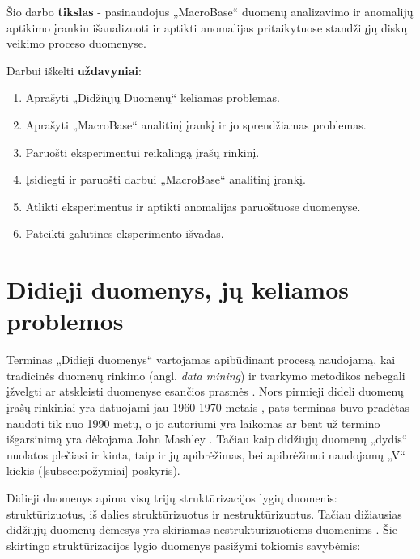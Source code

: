\documentclass{VUMIFPSkursinis}
\begin{document}
Šio darbo \textbf{tikslas} - pasinaudojus „MacroBase“ duomenų analizavimo ir anomalijų aptikimo įrankiu išanalizuoti ir aptikti anomalijas pritaikytuose standžiųjų diskų veikimo proceso duomenyse.\par

Darbui iškelti \textbf{uždavyniai}:\par

\begin{enumerate}
\item Aprašyti „Didžiųjų Duomenų“ keliamas problemas.
\item Aprašyti „MacroBase“ analitinį įrankį ir jo sprendžiamas problemas.
\item Paruošti eksperimentui reikalingą įrašų rinkinį.
\item Įsidiegti ir paruošti darbui „MacroBase“ analitinį įrankį.
\item Atlikti eksperimentus ir aptikti anomalijas paruoštuose duomenyse.
\item Pateikti galutines eksperimento išvadas.
\end{enumerate}

\section{Didieji duomenys, jų keliamos problemos} \label{sec:bigdata}
Terminas „Didieji duomenys“ vartojamas apibūdinant procesą naudojamą, kai tradicinės duomenų rinkimo (angl. \textit{data mining}) ir tvarkymo metodikos nebegali įžvelgti ar atskleisti duomenyse esančios prasmės \cite{bigdata}. Nors pirmieji dideli duomenų įrašų rinkiniai yra datuojami jau 1960-1970 metais \cite{first_bigdata}, pats terminas buvo pradėtas naudoti tik nuo 1990 metų, o jo autoriumi yra laikomas ar bent už termino išgarsinimą yra dėkojama John Mashley \cite{john_1, john_2, john_3}. Tačiau kaip didžiųjų duomenų „dydis“ nuolatos plečiasi ir kinta, taip ir jų apibrėžimas, bei apibrėžimui naudojamų „V“ kiekis (\ref{subsec:požymiai} poskyris).\par

Didieji duomenys apima visų trijų struktūrizacijos lygių duomenis: struktūrizuotus, iš dalies struktūrizuotus ir nestruktūrizuotus. Tačiau dižiausias didžiųjų duomenų dėmesys yra skiriamas nestruktūrizuotiems duomenims \cite{bigdata_data_struct}. Šie skirtingo struktūrizacijos lygio duomenys pasižymi tokiomis savybėmis:
\end{document}
